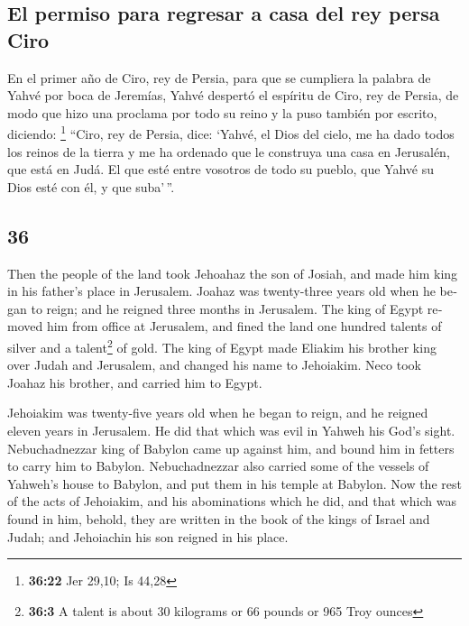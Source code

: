 \begin{paracol}{2}
\hypertarget{el-permiso-para-regresar-a-casa-del-rey-persa-ciro}{%
\subsection{El permiso para regresar a casa del rey persa
Ciro}\label{el-permiso-para-regresar-a-casa-del-rey-persa-ciro}}

 En el primer año de Ciro, rey de Persia, para que se
cumpliera la palabra de Yahvé por boca de Jeremías, Yahvé despertó el
espíritu de Ciro, rey de Persia, de modo que hizo una proclama por todo
su reino y la puso también por escrito, diciendo: \footnote{\textbf{36:22}
  Jer 29,10; Is 44,28}  ``Ciro, rey de Persia, dice:
`Yahvé, el Dios del cielo, me ha dado todos los reinos de la tierra y me
ha ordenado que le construya una casa en Jerusalén, que está en Judá. El
que esté entre vosotros de todo su pueblo, que Yahvé su Dios esté con
él, y que suba'\,''. \switchcolumn
\begin{otherlanguage}{english}

\hypertarget{section-71}{%
\section{36}\label{section-71}}

 Then the people of the land took Jehoahaz the son of
Josiah, and made him king in his father's place in Jerusalem.
 Joahaz was twenty-three years old when he began to reign;
and he reigned three months in Jerusalem.  The king of
Egypt removed him from office at Jerusalem, and fined the land one
hundred talents of silver and a talent\footnote{\textbf{36:3} A talent
  is about 30 kilograms or 66 pounds or 965 Troy ounces} of gold.
 The king of Egypt made Eliakim his brother king over
Judah and Jerusalem, and changed his name to Jehoiakim. Neco took Joahaz
his brother, and carried him to Egypt.

 Jehoiakim was twenty-five years old when he began to
reign, and he reigned eleven years in Jerusalem. He did that which was
evil in Yahweh his God's sight.  Nebuchadnezzar king of
Babylon came up against him, and bound him in fetters to carry him to
Babylon.  Nebuchadnezzar also carried some of the vessels
of Yahweh's house to Babylon, and put them in his temple at Babylon.
 Now the rest of the acts of Jehoiakim, and his
abominations which he did, and that which was found in him, behold, they
are written in the book of the kings of Israel and Judah; and Jehoiachin
his son reigned in his place.


\end{otherlanguage}
\end{paracol}
